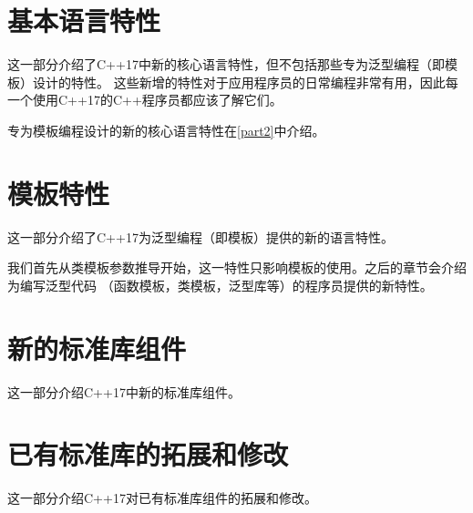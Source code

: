 \documentclass[twoside,10pt,AutoFakeBold,AutoFakeSlant]{book}
\begin{document}
\begin{sloppypar}
    \frontmatter
    \setcounter{secnumdepth}{0}
    \pagestyle{front}
    \tableofcontents

    
    
    

    \mainmatter
    \setcounter{secnumdepth}{2}
    \pagestyle{main}


    \part{基本语言特性}\label{part1}
    这一部分介绍了C++17中新的核心语言特性，但不包括那些专为泛型编程（即模板）设计的特性。
    这些新增的特性对于应用程序员的日常编程非常有用，因此每一个使用C++17的C++程序员都应该了解它们。

    专为模板编程设计的新的核心语言特性在\autoref{part2}中介绍。

    
    
    
    
    
    
    
    


    \part{模板特性}\label{part2}
    这一部分介绍了C++17为泛型编程（即模板）提供的新的语言特性。

    我们首先从类模板参数推导开始，这一特性只影响模板的使用。之后的章节会介绍为编写泛型代码
    （函数模板，类模板，泛型库等）的程序员提供的新特性。

    
    
    
    
    
    


    \part{新的标准库组件}\label{part3}
    这一部分介绍C++17中新的标准库组件。

    
    
    
    
    
    


    \part{已有标准库的拓展和修改}\label{part4}
    这一部分介绍C++17对已有标准库组件的拓展和修改。

    
    
    
    
    
    
    
    



\end{sloppypar}
\end{document}
